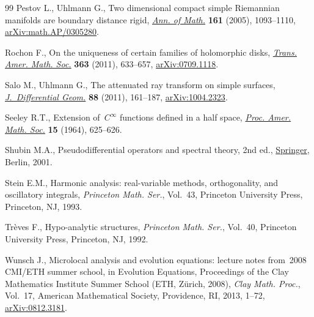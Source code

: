 \documentclass[pdftex]{sigma}
\numberwithin{equation}{section}
\theoremstyle{definition}
\newcommand{\1}{{\bf 1}}
\begin{document}
\begin{thebibliography}{99}
Pestov L., Uhlmann G., Two dimensional compact simple {R}iemannian manifolds
 are boundary distance rigid,
 \href{https://doi.org/10.4007/annals.2005.161.1093}{\textit{Ann. of Math.}}
 \textbf{161} (2005), 1093--1110,
 \href{http://arxiv.org/abs/math.AP/0305280}{arXiv:math.AP/0305280}.

Rochon F., On the uniqueness of certain families of holomorphic disks,
 \href{https://doi.org/10.1090/S0002-9947-2010-05159-1}{\textit{Trans. Amer.
 Math. Soc.}} \textbf{363} (2011), 633--657,
 \href{http://arxiv.org/abs/0709.1118}{arXiv:0709.1118}.

Salo M., Uhlmann G., The attenuated ray transform on simple surfaces,
 \href{https://doi.org/10.4310/jdg/1317758872}{\textit{J.~Differential Geom.}}
 \textbf{88} (2011), 161--187,
 \href{http://arxiv.org/abs/1004.2323}{arXiv:1004.2323}.

Seeley R.T., Extension of~{$C^{\infty }$} functions defined in a half space,
 \href{https://doi.org/10.2307/2034761}{\textit{Proc. Amer. Math. Soc.}}
 \textbf{15} (1964), 625--626.

Shubin M.A., Pseudodifferential operators and spectral theory, 2nd ed.,
 \href{https://doi.org/10.1007/978-3-642-56579-3}{Springer}, Berlin, 2001.

Stein E.M., Harmonic analysis: real-variable methods, orthogonality, and
 oscillatory integrals, \textit{Princeton Math. Ser.}, Vol.~43, Princeton
 University Press, Princeton, NJ, 1993.

Tr\`eves F., Hypo-analytic structures, \textit{Princeton Math. Ser.}, Vol.~40,
 Princeton University Press, Princeton, NJ, 1992.

Wunsch J., Microlocal analysis and evolution equations: lecture notes from~2008
 {CMI}/{ETH} summer school, in Evolution {E}quations, Proceedings of the Clay
 Mathematics Institute Summer School (ETH, Z\"urich, 2008), \textit{Clay Math.
 Proc.}, Vol.~17, American Mathematical Society, Providence, RI, 2013, 1--72,
 \href{http://arxiv.org/abs/0812.3181}{arXiv:0812.3181}.

\end{thebibliography}\LastPageEnding
\end{document}
